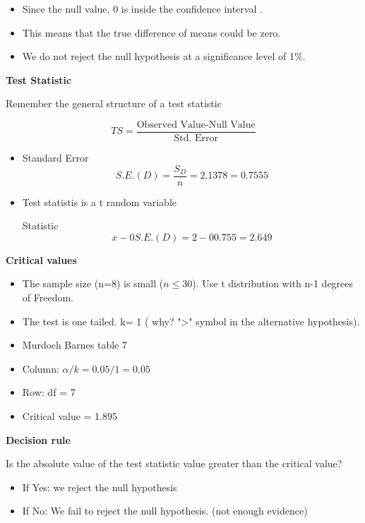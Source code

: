 ﻿\documentclass[]{report}
\begin{document}
\begin{itemize}
\item Since the null value, 0 is inside the confidence interval  .

\item This means that the true difference of means could be zero.

\item We do not reject the null hypothesis at a significance level of 1\%.

\end{itemize}


\noindent \textbf{Test Statistic}

Remember the general structure of a test statistic

\begin{framed}
\[TS =  \frac{\mbox{Observed Value-Null Value}}{\mbox{Std. Error}} \]
\end{framed}


\begin{itemize}
\item Standard Error\[S.E.(D) = \frac{S_D}{n}=2.1378= 0.7555\]

\item Test statistis is a t random variable

\itemTest Statistic\[x-0S.E.(D)=2 - 00.755= 2.649\]
\end{itemize}

\noindent \textbf{Critical values}

\begin{itemize}
\item The sample size (n=8) is small ($n \leq 30$). Use t distribution with n-1 degrees of Freedom.
\item The test is one tailed.  k= 1  ( why?  ">" symbol in the alternative hypothesis).
\item Murdoch Barnes table 7
\item Column:  $\alpha/k = 0.05/1= 0.05$
\item Row: df = 7
\item Critical value =  1.895    
\end{itemize}
\noindent \textbf{Decision rule}

\begin{framed}
\noindent Is the absolute value of the test statistic value greater than the critical value?
\begin{itemize}
\item If Yes: we reject the null hypothesis

\item If No: We fail to reject the null hypothesis. (not enough evidence)
\end{itemize}
\end{framed}
\end{document}
